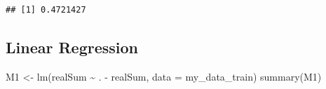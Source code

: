 \documentclass[
]{article}
\newenvironment{Shaded}{\begin{snugshade}}{\end{snugshade}}
\newcommand{\AttributeTok}[1]{\textcolor[rgb]{0.77,0.63,0.00}{#1}}
\newcommand{\FunctionTok}[1]{\textcolor[rgb]{0.00,0.00,0.00}{#1}}
\newcommand{\NormalTok}[1]{#1}
\newcommand{\OtherTok}[1]{\textcolor[rgb]{0.56,0.35,0.01}{#1}}
\newcommand{\SpecialCharTok}[1]{\textcolor[rgb]{0.00,0.00,0.00}{#1}}
\begin{document}
\begin{Shaded}
\end{Shaded}

\begin{verbatim}
## [1] 0.4721427
\end{verbatim}

\hypertarget{linear-regression}{%
\subsection{Linear Regression}\label{linear-regression}}

\begin{Shaded}
\begin{Highlighting}[]
\NormalTok{M1 }\OtherTok{\textless{}{-}} \FunctionTok{lm}\NormalTok{(realSum }\SpecialCharTok{\textasciitilde{}}\NormalTok{ . }\SpecialCharTok{{-}}\NormalTok{ realSum, }\AttributeTok{data =}\NormalTok{ my\_data\_train)}
\FunctionTok{summary}\NormalTok{(M1)}
\end{Highlighting}
\end{Shaded}
\end{document}
